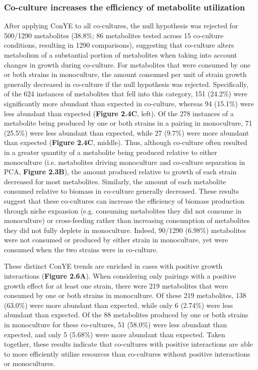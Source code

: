 \documentclass[11pt,onecolumn,notitlepage,openany,twoside]{book}
\begin{document}
\begin{refsection}
\subsubsection{Co-culture increases the efficiency of metabolite utilization}

After applying ConYE to all co-cultures, the null hypothesis was rejected for 500/1290 metabolites (38.8\%; 86 metabolites tested across 15 co-culture conditions, resulting in 1290 comparisons), suggesting that co-culture alters metabolism of a substantial portion of metabolites when taking into account changes in growth during co-culture. For metabolites that were consumed by one or both strains in monoculture, the amount consumed per unit of strain growth generally decreased in co-culture if the null hypothesis was rejected. Specifically, of the 624 instances of metabolites that fell into this category, 151 (24.2\%) were significantly more abundant than expected in co-culture, whereas 94 (15.1\%) were less abundant than expected (\textbf{Figure 2.4C}, left). Of the 278 instances of a metabolite being produced by one or both strains in a pairing in monoculture, 71 (25.5\%) were less abundant than expected, while 27 (9.7\%) were more abundant than expected (\textbf{Figure 2.4C}, middle). Thus, although co-culture often resulted in a greater quantity of a metabolite being produced relative to either monoculture (i.e. metabolites driving monoculture and co-culture separation in PCA, \textbf{Figure 2.3B}), the amount produced relative to growth of each strain decreased for most metabolites. Similarly, the amount of each metabolite consumed relative to biomass in co-culture generally decreased. These results suggest that these co-cultures can increase the efficiency of biomass production through niche expansion (e.g. consuming metabolites they did not consume in monoculture) or cross-feeding rather than increasing consumption of metabolites they did not fully deplete in monoculture. Indeed, 90/1290 (6.98\%) metabolites were not consumed or produced by either strain in monoculture, yet were consumed when the two strains were in co-culture.

These distinct ConYE trends are enriched in cases with positive growth interactions (\textbf{Figure 2.6A}). When considering only pairings with a positive growth effect for at least one strain, there were 219 metabolites that were consumed by one or both strains in monoculture. Of these 219 metabolites, 138 (63.0\%) were more abundant than expected, while only 6 (2.74\%) were less abundant than expected. Of the 88 metabolites produced by one or both strains in monoculture for these co-cultures, 51 (58.0\%) were less abundant than expected, and only 5 (5.68\%) were more abundant than expected. Taken together, these results indicate that co-cultures with positive interactions are able to more efficiently utilize resources than co-cultures without positive interactions or monocultures.


\end{refsection}
\end{document}
